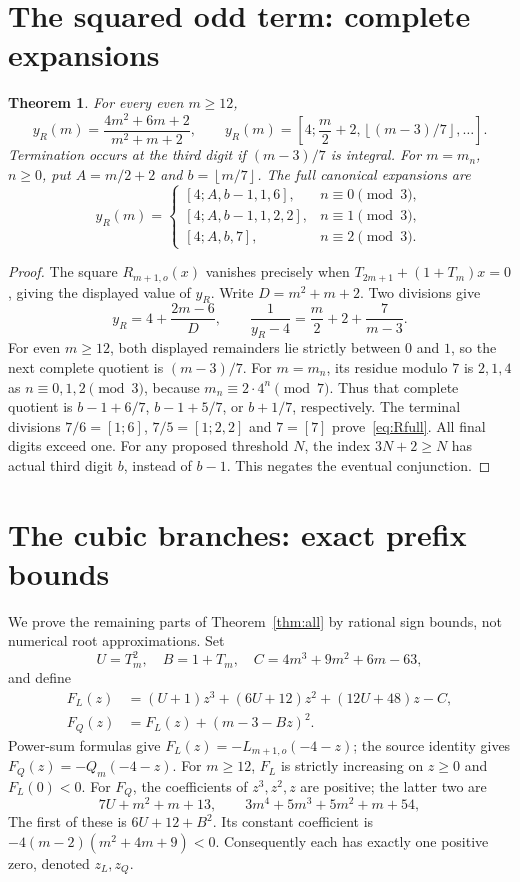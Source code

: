 \documentclass[11pt]{article}
\newtheorem{theorem}{Theorem}
\newcommand{\floor}[1]{\left\lfloor #1\right\rfloor}
\begin{document}
\section{The squared odd term: complete expansions}
\begin{theorem}\label{thm:R}
For every even $m\ge12$,
\[
 y_R(m)=\frac{4m^2+6m+2}{m^2+m+2},\qquad
 y_R(m)=\left[4;\frac m2+2,\floor{(m-3)/7},\ldots\right].
\]
Termination occurs at the third digit if $(m-3)/7$ is integral.
For $m=m_n$, $n\ge0$, put $A=m/2+2$ and $b=\floor{m/7}$.
The full canonical expansions are
\begin{equation}\label{eq:Rfull}
 y_R(m)=\begin{cases}
 [4;A,b-1,1,6],&n\equiv0\pmod3,\\
 [4;A,b-1,1,2,2],&n\equiv1\pmod3,\\
 [4;A,b,7],&n\equiv2\pmod3.
 \end{cases}
\end{equation}
\end{theorem}
\begin{proof}
The square $R_{m+1,o}(x)$ vanishes precisely when
$T_{2m+1}+(1+T_m)x=0$, giving the displayed value of $y_R$. Write $D=m^2+m+2$.
Two divisions give
\begin{equation}\label{eq:Rdivide}
 y_R=4+\frac{2m-6}{D},\qquad
 \frac1{y_R-4}=\frac m2+2+\frac7{m-3}.
\end{equation}
For even $m\ge12$, both displayed remainders lie strictly between $0$ and
$1$, so the next complete quotient is $(m-3)/7$.
For $m=m_n$, its residue modulo $7$ is $2,1,4$ as $n\equiv0,1,2\pmod3$,
because $m_n\equiv2\cdot4^n\pmod7$. Thus that complete quotient is
$b-1+6/7$, $b-1+5/7$, or $b+1/7$, respectively.
The terminal divisions $7/6=[1;6]$, $7/5=[1;2,2]$ and $7=[7]$
prove~\eqref{eq:Rfull}. All final digits exceed one.
For any proposed threshold $N$, the index $3N+2\ge N$ has actual third
digit $b$, instead of $b-1$. This negates the eventual conjunction.
\end{proof}

\section{The cubic branches: exact prefix bounds}
We prove the remaining parts of Theorem~\ref{thm:all} by rational sign
bounds, not numerical root approximations. Set
\[
 U=T_m^2,\quad B=1+T_m,\quad C=4m^3+9m^2+6m-63,
\]
and define
\begin{align}
 F_L(z)&=(U+1)z^3+(6U+12)z^2+(12U+48)z-C,\label{eq:FL}\\
 F_Q(z)&=F_L(z)+(m-3-Bz)^2.\label{eq:FQ}
\end{align}
Power-sum formulas give $F_L(z)=-L_{m+1,o}(-4-z)$; the source identity gives
$F_Q(z)=-Q_m(-4-z)$.
For $m\ge12$, $F_L$ is strictly increasing on $z\ge0$ and $F_L(0)<0$.
For $F_Q$, the coefficients of $z^3,z^2,z$ are positive; the latter two are
\[
 7U+m^2+m+13,\qquad
 3m^4+5m^3+5m^2+m+54,
\]
The first of these is $6U+12+B^2$.
Its constant coefficient is $-4(m-2)(m^2+4m+9)<0$.
Consequently each has exactly one positive zero, denoted $z_L,z_Q$.
\end{document}
